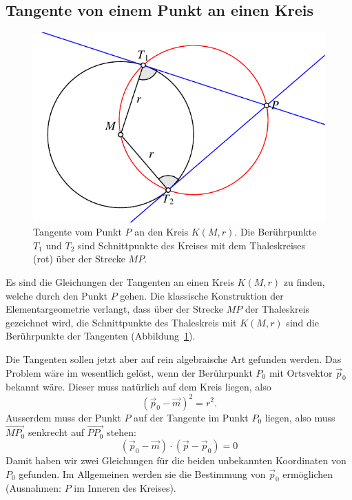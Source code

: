 \subsection{Tangente von einem Punkt an einen Kreis}
\begin{figure}
\centering
\includegraphics{4/images/tangentepunkt.pdf}
\caption{Tangente vom Punkt $P$ an den Kreis $K(M,r)$.
Die Berührpunkte $T_1$ und $T_2$ sind Schnittpunkte des Kreises mit
dem Thaleskreises (rot) über der Strecke $MP$.
\label{skript:ortho:tangentepunkt}}
\end{figure}
Es sind die Gleichungen der Tangenten an einen Kreis $K(M,r)$ zu finden,
welche durch den Punkt $P$ gehen.
Die klassische Konstruktion der
Elementargeometrie verlangt, dass über der Strecke $MP$ der
Thaleskreis gezeichnet wird, die Schnittpunkte des Thaleskreis mit
$K(M,r)$ sind die Berührpunkte der Tangenten
(Abbildung~\ref{skript:ortho:tangentepunkt}).

Die Tangenten sollen jetzt aber auf rein algebraische Art gefunden
werden.
Das Problem wäre im wesentlich gelöst, wenn der Berührpunkt $P_0$
mit Ortsvektor
$\vec p_0$ bekannt wäre.
Dieser muss natürlich auf dem Kreis liegen,
also
\[
(\vec p_0-\vec m)^2=r^2.
\]
Ausserdem muss der Punkt $P$ auf der Tangente im Punkt $P_0$ liegen,
also muss $\overrightarrow{MP_0}$ senkrecht auf $\overrightarrow{PP_0}$ stehen:
\begin{equation}
(\vec p_0-\vec m)\cdot(\vec p-\vec p_0)=0
\label{thalesbedingung}
\end{equation}
Damit haben wir zwei Gleichungen für die beiden unbekannten Koordinaten
von $P_0$ gefunden.
Im Allgemeinen werden sie die Bestimmung von $\vec p_0$
ermöglichen (Ausnahmen: $P$ im Inneren des Kreises).

